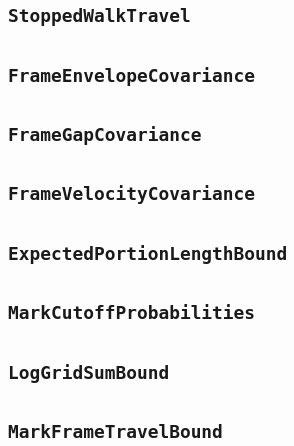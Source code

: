 \documentclass[11pt]{amsart}
\theoremstyle{definition}
\begin{document}
\subsection{\texorpdfstring{\texttt{StoppedWalkTravel}}{StoppedWalkTravel}}\label{node:StoppedWalkTravel}


\subsection{\texorpdfstring{\texttt{FrameEnvelopeCovariance}}{FrameEnvelopeCovariance}}\label{node:FrameEnvelopeCovariance}


\subsection{\texorpdfstring{\texttt{FrameGapCovariance}}{FrameGapCovariance}}\label{node:FrameGapCovariance}


\subsection{\texorpdfstring{\texttt{FrameVelocityCovariance}}{FrameVelocityCovariance}}\label{node:FrameVelocityCovariance}


\subsection{\texorpdfstring{\texttt{ExpectedPortionLengthBound}}{ExpectedPortionLengthBound}}\label{node:ExpectedPortionLengthBound}


\subsection{\texorpdfstring{\texttt{MarkCutoffProbabilities}}{MarkCutoffProbabilities}}\label{node:MarkCutoffProbabilities}


\subsection{\texorpdfstring{\texttt{LogGridSumBound}}{LogGridSumBound}}\label{node:LogGridSumBound}


\subsection{\texorpdfstring{\texttt{MarkFrameTravelBound}}{MarkFrameTravelBound}}\label{node:MarkFrameTravelBound}

\end{document}
